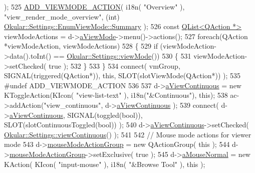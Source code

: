 \begin{DoxyCode}
{       );
525     \hyperlink{pageview_8cpp_a4cec0467f9d945fd6a0027c3c339c725}{ADD\_VIEWMODE\_ACTION}( i18n( \textcolor{stringliteral}{"Overview"} ), \textcolor{stringliteral}{"view\_render\_mode\_overview"}, (\textcolor{keywordtype}{int})
      \hyperlink{classOkular_1_1Settings_1_1EnumViewMode_a33bc89b0f0c02bd5539bad916569a665a6551656e4f96799c3792390290c061fb}{Okular::Settings::EnumViewMode::Summary} );
526     \textcolor{keyword}{const} \hyperlink{classQList}{QList<QAction *>} viewModeActions = d->\hyperlink{classPageViewPrivate_a89d998dea21b24010b2578c6b4f5d9d2}{aViewMode}->menu()->actions();
527     \textcolor{keywordflow}{foreach}(QAction *viewModeAction, viewModeActions)
528     \{
529         \textcolor{keywordflow}{if} (viewModeAction->data().toInt() == \hyperlink{classOkular_1_1Settings_a54872ccea98a1749bdccc6552c1aaa84}{Okular::Settings::viewMode}())
530         \{
531             viewModeAction->setChecked( \textcolor{keyword}{true} );
532         \}
533     \}
534     connect( vmGroup, SIGNAL(triggered(QAction*)), \textcolor{keyword}{this}, SLOT(slotViewMode(QAction*)) );
535 \textcolor{preprocessor}{#undef ADD\_VIEWMODE\_ACTION}
536 
537     d->\hyperlink{classPageViewPrivate_a9b68e639f07533308f37c0e1654a9c9a}{aViewContinuous}  = \textcolor{keyword}{new} KToggleAction(KIcon( \textcolor{stringliteral}{"view-list-text"} ), i18n(\textcolor{stringliteral}{"&Continuous"}), \textcolor{keyword}{
      this});
538     ac->addAction(\textcolor{stringliteral}{"view\_continuous"}, d->\hyperlink{classPageViewPrivate_a9b68e639f07533308f37c0e1654a9c9a}{aViewContinuous} );
539     connect( d->\hyperlink{classPageViewPrivate_a9b68e639f07533308f37c0e1654a9c9a}{aViewContinuous}, SIGNAL(toggled(\textcolor{keywordtype}{bool})), SLOT(slotContinuousToggled(\textcolor{keywordtype}{bool})) );
540     d->\hyperlink{classPageViewPrivate_a9b68e639f07533308f37c0e1654a9c9a}{aViewContinuous}->setChecked( 
      \hyperlink{classOkular_1_1Settings_a6f16a784dc815b9192ce24d054e3f82b}{Okular::Settings::viewContinuous}() );
541 
542     \textcolor{comment}{// Mouse mode actions for viewer mode}
543     d->\hyperlink{classPageViewPrivate_ae7b75854286f78f9b871f99bebb1eb73}{mouseModeActionGroup} = \textcolor{keyword}{new} QActionGroup( \textcolor{keyword}{this} );
544     d->\hyperlink{classPageViewPrivate_ae7b75854286f78f9b871f99bebb1eb73}{mouseModeActionGroup}->setExclusive( \textcolor{keyword}{true} );
545     d->\hyperlink{classPageViewPrivate_aad98b5d46ed82c5423f13cd1a10d0253}{aMouseNormal}  = \textcolor{keyword}{new} KAction( KIcon( \textcolor{stringliteral}{"input-mouse"} ), i18n( \textcolor{stringliteral}{"&Browse Tool"} ), \textcolor{keyword}{this} );
}
\end{DoxyCode}
